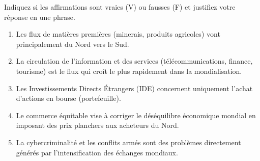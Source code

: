\documentclass[11pt]{article}
\begin{document}
\begin{exercice}
Indiquez si les affirmations sont vraies (V) ou fausses (F) et justifiez votre réponse en une phrase.
\begin{enumerate}
    \item Les flux de matières premières (minerais, produits agricoles) vont principalement du Nord vers le Sud.
    \item La circulation de l'information et des services (télécommunications, finance, tourisme) est le flux qui croît le plus rapidement dans la mondialisation.
    \item Les Investissements Directs Étrangers (IDE) concernent uniquement l'achat d'actions en bourse (portefeuille).
    \item Le commerce équitable vise à corriger le déséquilibre économique mondial en imposant des prix planchers aux acheteurs du Nord.
    \item La cybercriminalité et les conflits armés sont des problèmes directement générés par l'intensification des échanges mondiaux.
\end{enumerate}
\end{exercice}
\end{document}
